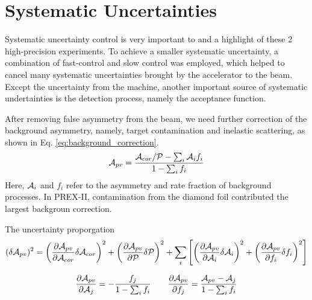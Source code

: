 \chapter{Systematic Uncertainties}

Systematic uncertainty control is very important to and a highlight of these 2
high-precision experiments. To achieve a smaller systematic uncertainty, a
combination of fast-control and slow control was employed, which helped 
to cancel many systematic uncertainties brought by the accelerator to the
beam. Except the uncertainty from the machine, another important source
of systematic undertainties is the detection process, namely the 
acceptance function.

After removing false asymmetry from the beam, we need further correction of the
background asymmetry, namely, target contamination and inelastic scattering,
as shown in Eq. \ref{eq:background_correction}.
\begin{equation}
    \mathcal{A}_{pv} = \frac{\mathcal{A}_{cor}/\mathcal{P} - \sum_i \mathcal{A}_i f_i}{1 - \sum_i f_i}
    \label{eq:background_correction}
\end{equation}
Here, $\mathcal{A}_i$ and $f_i$ refer to the asymmetry and rate fraction of background
processes. In PREX-II, contamination from the diamond foil contributed the
largest backgroun correction.

The uncertainty proporgation
\begin{equation}
    (\delta \mathcal{A}_{pv})^2 = 
      \left( \frac{\partial \mathcal{A}_{pv}}{\partial \mathcal{A}_{cor}} \delta \mathcal{A}_{cor} \right)^2
      + \left( \frac{\partial \mathcal{A}_{pv}}{\partial \mathcal{P}} \delta \mathcal{P} \right)^2
      + \sum_i \left[ \left(\frac{\partial \mathcal{A}_{pv}}{\partial \mathcal{A}_i}\delta \mathcal{A}_i \right)^2 
	 + \left(\frac{\partial \mathcal{A}_{pv}}{\partial f_i}\delta f_i \right)^2 \right]
\end{equation}

\begin{equation}
    \frac{\partial \mathcal{A}_{pv}}{\partial \mathcal{A}_j} = -\frac{f_j}{1 - \sum_i f_i}  \qquad
    \frac{\partial \mathcal{A}_{pv}}{\partial f_j} = \frac{\mathcal{A}_{pv} - \mathcal{A}_j}{1 - \sum_i f_i}
    \label{eq:systematic_uncertainty}
\end{equation}

